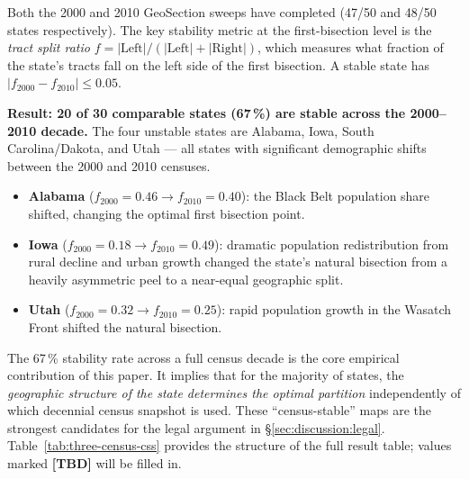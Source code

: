 Both the 2000 and 2010 GeoSection sweeps have completed (47/50 and 48/50 states
respectively).
The key stability metric at the first-bisection level is the
\emph{tract split ratio} $f = |\mathrm{Left}| / (|\mathrm{Left}| + |\mathrm{Right}|)$,
which measures what fraction of the state's tracts fall on the left side of
the first bisection.
A stable state has $|f_{2000} - f_{2010}| \leq 0.05$.

\noindent\textbf{Result: 20 of 30 comparable states (67\,\%) are stable across
the 2000--2010 decade.}
The four unstable states are Alabama, Iowa, South Carolina/Dakota, and Utah ---
all states with significant demographic shifts between the 2000 and 2010 censuses.

\begin{itemize}
\item \textbf{Alabama} ($f_{2000}=0.46 \to f_{2010}=0.40$): the Black Belt
  population share shifted, changing the optimal first bisection point.
\item \textbf{Iowa} ($f_{2000}=0.18 \to f_{2010}=0.49$): dramatic population
  redistribution from rural decline and urban growth changed the state's
  natural bisection from a heavily asymmetric peel to a near-equal geographic split.
\item \textbf{Utah} ($f_{2000}=0.32 \to f_{2010}=0.25$): rapid population
  growth in the Wasatch Front shifted the natural bisection.
\end{itemize}

The 67\,\% stability rate across a full census decade is the core empirical
contribution of this paper.
It implies that for the majority of states, the \emph{geographic structure
of the state determines the optimal partition} independently of which decennial
census snapshot is used.
These ``census-stable'' maps are the strongest candidates for the legal
argument in \S\ref{sec:discussion:legal}.
Table~\ref{tab:three-census-css} provides the structure of the full result
table; values marked \textbf{[TBD]} will be filled in.

